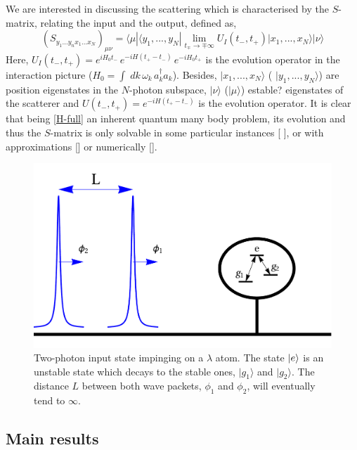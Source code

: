 \documentclass[notitlepage, prx, preprint, amsmath,superscriptaddress,amssymb]{revtex4-1}
\begin{document}
We are interested in discussing the scattering which is characterised by the $S$-matrix, relating the input and the output, defined as,
\begin{equation}
\label{Sdef}
( S_{y_1 ...y_n x_1...x_N} )_{\mu \nu} = \langle \mu | \langle y_1, ..., y_N | \lim_{t_\mp  \to \mp \infty} U_I(t_-, t_+) | x_1, ..., x_N \rangle | \nu \rangle
\end{equation}
Here,  $U_I(t_-, t_+)= e^{i H_0 t_-} \,  e^{-i H (t_+- t_-)}  \,  e^{-i H_0 t_+}$ is the evolution operator  in the interaction picture ($H_0=  \int \; d k  \, \omega_k \, a_k^\dagger a_k $).
Besides, $|x_1, ...,x_N\rangle$ ( $|y_1, ...,y_N\rangle$)  are  position eigenstates in the $N$-photon subspace,  $|\nu \rangle$  ($|\mu\rangle$) {\color{blue} estable?} eigenstates of the scatterer and $U (t_-, t_+) = e^{-i H (t_+-t_-)}$ is the evolution operator.  
It is clear that being \eqref{H-full} an inherent quantum many body problem, its evolution and thus the $S$-matrix is only solvable in some particular instances [ ], or with  approximations [] or numerically [].    

  
\begin{figure}
\includegraphics[scale=0.25]{input.pdf}
\caption{Two-photon input state impinging on a $\lambda$ atom. The state $\ket{e}$ is an unstable state which decays to the stable ones, $|g_1\rangle$ and $|g_2\rangle$. The distance $L$ between both wave packets, $\phi_1$ and $\phi_2$, will eventually tend to $\infty$.}
\label{fig:input}
\end{figure}





\subsection{Main results}
\end{document}
